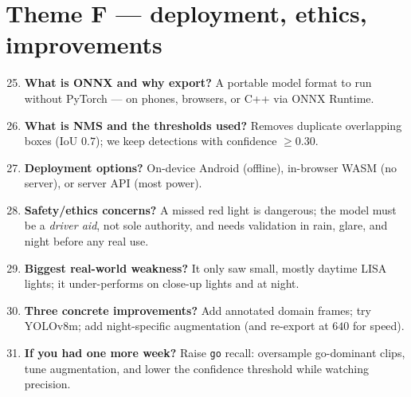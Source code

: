 \section{Theme F --- deployment, ethics, improvements}
\begin{enumerate}\setcounter{enumi}{24}
  \item \textbf{What is ONNX and why export?} A portable model format to
        run without PyTorch --- on phones, browsers, or C++ via ONNX
        Runtime.
  \item \textbf{What is NMS and the thresholds used?} Removes duplicate
        overlapping boxes (IoU $0.7$); we keep detections with confidence
        $\ge 0.30$.
  \item \textbf{Deployment options?} On-device Android (offline),
        in-browser WASM (no server), or server API (most power).
  \item \textbf{Safety/ethics concerns?} A missed red light is dangerous;
        the model must be a \emph{driver aid}, not sole authority, and
        needs validation in rain, glare, and night before any real use.
  \item \textbf{Biggest real-world weakness?} It only saw small, mostly
        daytime LISA lights; it under-performs on close-up lights and at
        night.
  \item \textbf{Three concrete improvements?} Add annotated domain
        frames; try YOLOv8m; add night-specific augmentation (and
        re-export at $640$ for speed).
  \item \textbf{If you had one more week?} Raise \texttt{go} recall:
        oversample go-dominant clips, tune augmentation, and lower the
        confidence threshold while watching precision.
\end{enumerate}

